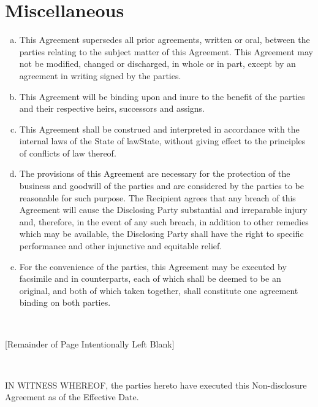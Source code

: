 \documentclass[12pt]{article}
\newcommand{\VAR}[1]{{\color{blue}#1}}
\newcommand{\BLOCK}[1]{~\newline{ \color{red}#1 }}
\begin{document}
\section{Miscellaneous}
\begin{enumerate}[a)]
\item This Agreement supersedes all prior agreements, written or oral, between the parties relating to the subject matter of this Agreement.  This Agreement may not be modified, changed or discharged, in whole or in part, except by an agreement in writing signed by the parties.
\item This Agreement will be binding upon and inure to the benefit of the parties and their respective heirs, successors and assigns.
\item This Agreement shall be construed and interpreted in accordance with the internal laws of the State of \VAR{lawState}, without giving effect to the principles of conflicts of law thereof.
\item The provisions of this Agreement are necessary for the protection of the business and goodwill of the parties and are considered by the parties to be reasonable for such purpose.  The Recipient agrees that any breach of this Agreement will cause the Disclosing Party substantial and irreparable injury and, therefore, in the event of any such breach, in addition to other remedies which may be available, the Disclosing Party shall have the right to specific performance and other injunctive and equitable relief.
\item For the convenience of the parties, this Agreement may be executed by facsimile and in counterparts, each of which shall be deemed to be an original, and both of which taken together, shall constitute one agreement binding on both parties.
\end{enumerate}

\BLOCK{if toPdf}
\vspace{1cm}
\begin{center}
[Remainder of Page Intentionally Left Blank]
\end{center}
\newpage
\BLOCK{endif}

IN WITNESS WHEREOF, the parties hereto have executed this Non-disclosure Agreement as of the Effective Date.

\renewcommand{\arraystretch}{2}
\setlength\parindent{0pt}

\vspace{2cm}
\end{document}
